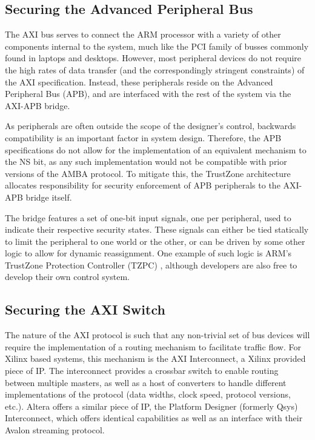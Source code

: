 \documentclass[journal]{IEEEtran}
\begin{document}
\subsection{Securing the Advanced Peripheral Bus}
The AXI bus serves to connect the ARM processor with a variety of other components
internal to the system, much like the PCI family of busses commonly found in laptops and
desktops. However, most peripheral devices do not require the high rates of data transfer
(and the correspondingly stringent constraints) of the AXI specification. Instead, these
peripherals reside on the Advanced Peripheral Bus (APB), and are interfaced with the rest
of the system via the AXI-APB bridge.\cite{noauthor_arm_nodate}

As peripherals are often outside the scope of the designer's control, backwards
compatibility is an important factor in system design. Therefore, the APB specifications
do not allow for the implementation of an equivalent mechanism to the NS bit, as any such
implementation would not be compatible with prior versions of the AMBA protocol. To 
mitigate this, the TrustZone architecture allocates responsibility for security
enforcement of APB peripherals to the AXI-APB bridge itself.

The bridge features a set of one-bit input signals, one per peripheral, used to indicate
their respective security states. These signals can either be tied statically to limit
the peripheral to one world or the other, or can be driven by some other logic to allow
for dynamic reassignment. One example of such logic is ARM's TrustZone Protection 
Controller (TZPC) \cite{noauthor_arm_nodate}, although developers are also free to develop
their own control system.

\subsection{Securing the AXI Switch}
The nature of the AXI protocol is such that any non-trivial set of bus devices will
require the implementation of a routing mechanism to facilitate traffic flow. For Xilinx
based systems, this mechanism is the AXI Interconnect, a Xilinx provided piece of IP. 
\cite{noauthor_axi_2017} The interconnect provides a crossbar switch to enable routing 
between multiple masters, as well as a host of converters to handle different 
implementations of the protocol (data widths, clock speed, protocol versions, etc.). 
Altera offers a similar piece of IP, the Platform Designer (formerly Qsys) Interconnect,
which offers identical capabilities as well as an interface with their Avalon streaming
protocol. \cite{noauthor_intel_nodate}
\end{document}
